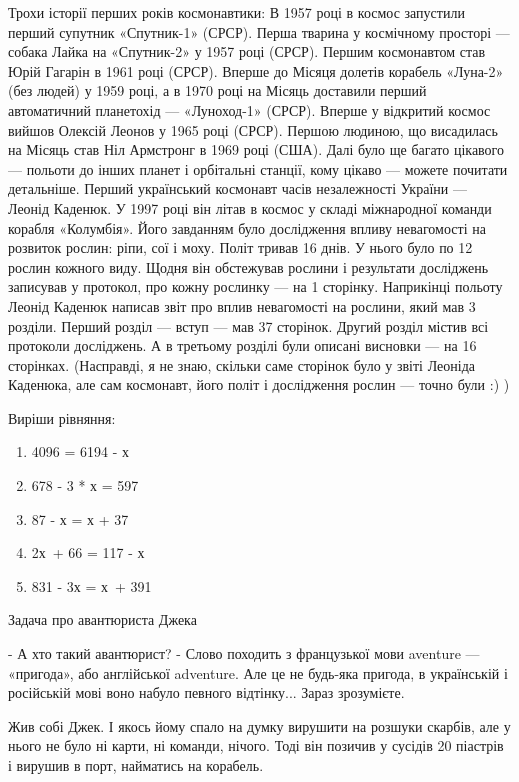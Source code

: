 Трохи історії перших років космонавтики:
В 1957 році в космос запустили перший супутник «Спутник-1» (СРСР).
Перша тварина у космічному просторі --- собака Лайка на «Спутник-2»
у 1957 році (СРСР).
Першим космонавтом став Юрій Гагарін в 1961 році (СРСР).
Вперше до Місяця долетів корабель «Луна-2» (без людей) у 1959 році,
а в 1970 році на Місяць доставили перший автоматичний планетохід —
«Луноход-1» (СРСР).
Вперше у відкритий космос вийшов Олексій Леонов у 1965 році (СРСР).
Першою людиною, що висадилась на Місяць став Ніл Армстронг в 1969 році (США).
Далі було ще багато цікавого --- польоти до інших планет і орбітальні станції,
кому цікаво --- можете почитати детальніше.
Перший український космонавт часів незалежності України --- Леонід Каденюк.
У 1997 році він літав в космос у складі міжнародної команди корабля «Колумбія».
Його завданням було дослідження впливу невагомості на розвиток рослин:
ріпи, сої і моху. Політ тривав 16 днів. У нього було по 12 рослин кожного виду.
Щодня він обстежував рослини і результати досліджень записував у протокол,
про кожну рослинку --- на 1 сторінку. Наприкінці польоту Леонід Каденюк
написав звіт про вплив невагомості на рослини, який мав 3 розділи.
Перший розділ --- вступ --- мав 37 сторінок. Другий розділ містив всі
протоколи досліджень. А в третьому розділі були описані висновки ---
на 16 сторінках.
(Насправді, я не знаю, скільки саме сторінок було у звіті Леоніда Каденюка,
але сам космонавт, його політ і дослідження рослин --- точно були :) )


\problem
Виріши рівняння:
\begin{multicols}{2}
    \begin{enumerate}
        \item 4096 = 6194 - х
        \item 678 - 3 * х = 597
        \item 87 - х = х + 37
        \item 2х + 66 = 117 - х
        \item 831 - 3х = х + 391
    \end{enumerate}
\end{multicols}


\problem
Задача про авантюриста Джека

- А хто такий авантюрист?
- Слово походить з французької мови aventure --- «пригода»,
або англійської adventure. Але це не будь-яка пригода,
в українській і російській мові воно набуло певного відтінку...
Зараз зрозумієте.

Жив собі Джек. І якось йому спало на думку вирушити на розшуки скарбів,
але у нього не було ні карти, ні команди, нічого. Тоді він позичив
у сусідів 20 піастрів і вирушив в порт, найматись на корабель.

